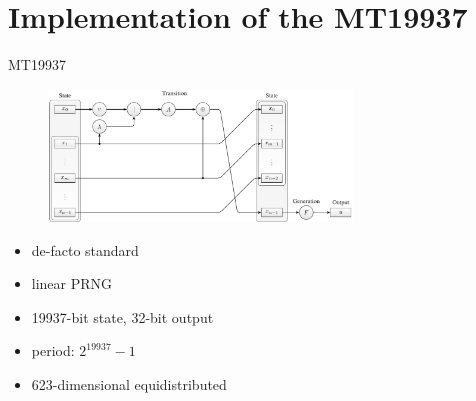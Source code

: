 \documentclass[aspectratio=169]{beamer}
\begin{document}
    \section{Implementation of the MT19937}
    \begin{frame}{MT19937}
      \begin{figure}
        \includegraphics[width=0.72\textwidth]{figures/mt19937_scheme.pdf}
      \end{figure}
      \bigskip
      \begin{minipage}{0.49\textwidth}
        \begin{itemize}
          \pause
          \item de-facto standard
          \pause
          \item linear PRNG
          \pause
          \item 19937-bit state, 32-bit output
        \end{itemize}
      \end{minipage}
      \hfill
      \begin{minipage}{0.4\textwidth}
        \begin{itemize}
          \pause
          \item period: $2^{19937}-1$
          \pause
          \item 623-dimensional equidistributed
        \end{itemize}
      \end{minipage}
    \end{frame}
\end{document}
